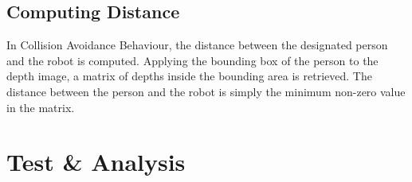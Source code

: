\subsection{Computing Distance}
In Collision Avoidance Behaviour, the distance between the designated person and the robot is computed.
Applying the bounding box of the person to the depth image, a matrix of depths inside the bounding area is retrieved.
The distance between the person and the robot is simply the minimum non-zero value in the matrix.

\section{Test \& Analysis}

